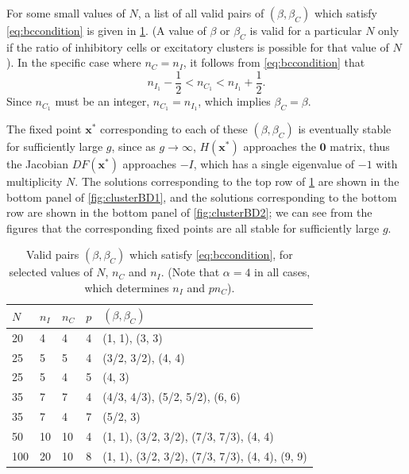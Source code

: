 \documentclass[reqno]{siamonline190516}
\newcommand{\xvec}{\mathbf{x}}
\newcommand{\Zerovec}{\mathbf{0}}
\begin{document}
For some small values of $N$, a list of all valid pairs of $(\beta, \beta_C)$ which satisfy \cref{eq:bccondition} is given in \cref{table:validbeta}. (A value of $\beta$ or $\beta_C$ is valid for a particular $N$ only if the ratio of inhibitory cells or excitatory clusters is possible for that value of $N$). In the specific case where $n_C = n_I$, it follows from \cref{eq:bccondition} that 
\[
n_{I_1} - \frac{1}{2} < n_{C_1} < n_{I_1} + \frac{1}{2}.
\]
Since $n_{C_1}$ must be an integer, $n_{C_1} = n_{I_1}$, which implies $\beta_C = \beta$.

The fixed point $\xvec^*$ corresponding to each of these $(\beta, \beta_C)$ is eventually stable for sufficiently large $g$, since as $g\rightarrow \infty$, $H(\xvec^*)$ approaches the $\Zerovec$ matrix, thus the Jacobian $DF(\xvec^*)$ approaches $-I$, which has a single eigenvalue of $-1$ with multiplicity $N$. The solutions corresponding to the top row of \cref{table:validbeta} are shown in the bottom panel of \cref{fig:clusterBD1}, and the solutions corresponding to the bottom row are shown in the bottom panel of \cref{fig:clusterBD2}; we can see from the figures that the corresponding fixed points are all stable for sufficiently large $g$.

\begin{table}
\centering
    \begin{tabular}{lllll}
        \toprule
        $N$ & $n_I$ & $n_C$ & $p$ & $(\beta, \beta_C)$ \\
        \midrule
        20 & 4 & 4 & 4 & (1, 1), (3, 3) \\
        25 & 5 & 5 & 4 & (3/2, 3/2), (4, 4) \\
        25 & 5 & 4 & 5 & (4, 3) \\
        35 & 7 & 7 & 4 & (4/3, 4/3), (5/2, 5/2), (6, 6) \\
        35 & 7 & 4 & 7 & (5/2, 3) \\
        50 & 10 & 10 & 4 & (1, 1), (3/2, 3/2), (7/3, 7/3), (4, 4) \\
        100 & 20 & 10 & 8 & (1, 1), (3/2, 3/2), (7/3, 7/3), (4, 4), (9, 9) \\
        \bottomrule
    \end{tabular}
    \vspace{0.25cm}
    \caption{Valid pairs $(\beta, \beta_C)$ which satisfy \cref{eq:bccondition}, for selected values of $N$, $n_C$ and $n_I$. (Note that $\alpha = 4$ in all cases, which determines $n_I$ and $p n_C$).}
    \label{table:validbeta}
\end{table}
\end{document}
